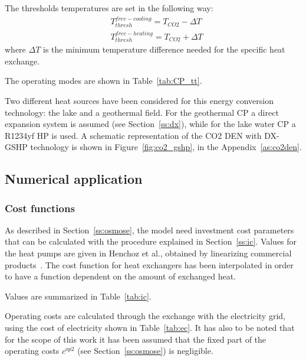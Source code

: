 \documentclass{article}
\begin{document}
The thresholds temperatures are set in the following way:
\begin{align}
& T_{thresh}^{free-cooling} = T_{CO2} - \Delta T \\
& T_{thresh}^{free-heating} = T_{CO2} + \Delta T 
\end{align}
where $\Delta T$ is the minimum temperature difference needed for the specific heat exchange.

The operating modes are shown in Table~\ref{tab:CP_tt}.


Two different heat sources have been considered for this energy conversion technology: the lake and a geothermal field. For the geothermal CP a direct expansion system is assumed (see Section~\ref{ss:dx}), while for the lake water CP a R1234yf HP is used. A schematic representation of the CO2 DEN with DX-GSHP technology is shown in Figure~\ref{fig:co2_gshp}, in the Appendix~\ref{as:co2den}.

\subsection{Numerical application}

\subsubsection{Cost functions}\label{sss:cf}

As described in Section~\ref{ss:osmose}, the model need investment cost parameters that can be calculated with the procedure explained in Section~\ref{ss:ic}.
Values for the heat pumps are given in Henchoz et al., obtained by linearizing commercial products~\cite{henchozPerformanceProfitabilityPerspectives2015}. The cost function for heat exchangers has been interpolated in order to have a function dependent on the amount of exchanged heat.

Values are summarized in Table~\ref{tab:ic}.



Operating costs are calculated through the exchange with the electricity grid, using the cost of electricity shown in Table~\ref{tab:ec}.
It has also to be noted that for the scope of this work it has been assumed that the fixed part of the operating costs $c^{op2}$ (see Section~\ref{ss:osmose}) is negligible.


\end{document}
